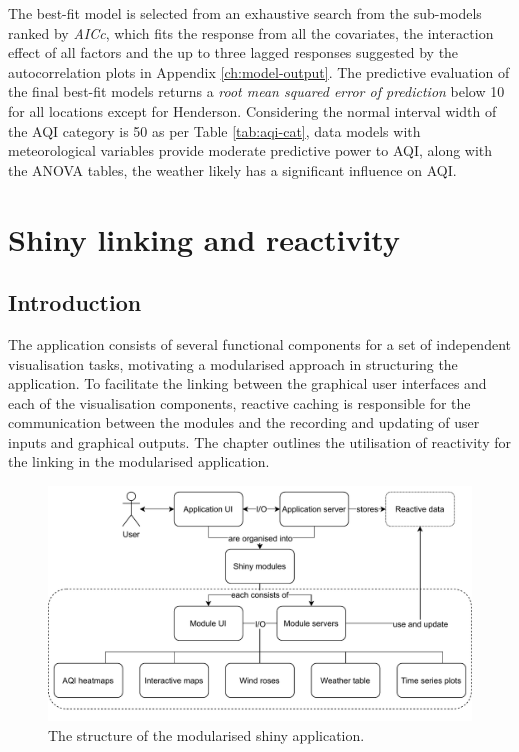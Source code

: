 \documentclass{aucklandthesis}
\begin{document}
The best-fit model is selected from an exhaustive search from the sub-models ranked by \emph{AICc}, which fits the response from all the covariates, the interaction effect of all factors and the up to three lagged responses suggested by the autocorrelation plots in Appendix \ref{ch:model-output}. The predictive evaluation of the final best-fit models returns a \emph{root mean squared error of prediction} below 10 for all locations except for Henderson. Considering the normal interval width of the AQI category is 50 as per Table \ref{tab:aqi-cat}, data models with meteorological variables provide moderate predictive power to AQI, along with the ANOVA tables, the weather likely has a significant influence on AQI.

\hypertarget{ch:linking}{%
\chapter{Shiny linking and reactivity}\label{ch:linking}}

\hypertarget{introduction-2}{%
\section{Introduction}\label{introduction-2}}

The application consists of several functional components for a set of independent visualisation tasks, motivating a modularised approach in structuring the application. To facilitate the linking between the graphical user interfaces and each of the visualisation components, reactive caching is responsible for the communication between the modules and the recording and updating of user inputs and graphical outputs. The chapter outlines the utilisation of reactivity for the linking in the modularised application.

\begin{figure}
\includegraphics[width=1\linewidth]{figures/app-structure} \caption{The structure of the modularised shiny application.}\label{fig:unnamed-chunk-6}
\end{figure}
\end{document}
